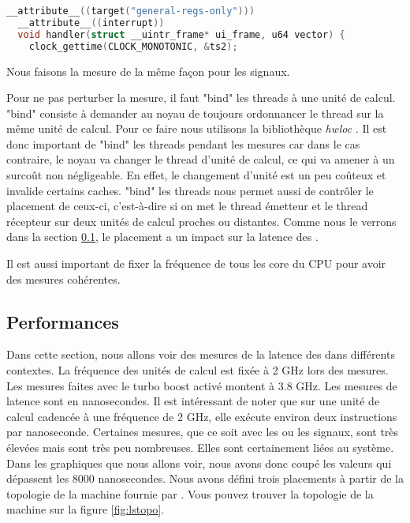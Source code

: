 
\begin{lstlisting}[language=c, caption=Déclaration du handler \uintr{}, label={lst:unitrHandler}]
  __attribute__((target("general-regs-only")))
  __attribute__((interrupt))
  void handler(struct __uintr_frame* ui_frame, u64 vector) {
    clock_gettime(CLOCK_MONOTONIC, &ts2);
\end{lstlisting}


Nous faisons la mesure de la même façon pour les signaux.

Pour ne pas perturber la mesure, il faut "bind" les threads à une unité de calcul.
"bind" consiste à demander au noyau de toujours ordonnancer le thread sur la même unité de calcul.
Pour ce faire nous utilisons la bibliothèque \emph{hwloc} \cite{hwloc}.
Il est donc important de "bind" les threads pendant les mesures car dans le cas contraire,
le noyau va changer le thread d'unité de calcul, ce qui va amener à un surcoût non négligeable.
En effet, le changement d'unité est un peu coûteux et invalide certains caches.
"bind" les threads nous permet aussi de contrôler le placement de ceux-ci, c'est-à-dire si on met le thread émetteur et le thread récepteur sur deux unités de calcul proches ou distantes.
Comme nous le verrons dans la section \ref{sec:performance}, le placement a un impact sur la latence des \uintr{}.

Il est aussi important de fixer la fréquence de tous les core du CPU pour avoir des mesures cohérentes.

\subsection{Performances}
\label{sec:performance}

Dans cette section, nous allons voir des mesures de la latence des \uintr{} dans différents contextes.
La fréquence des unités de calcul est fixée à 2 GHz lors des mesures.
Les mesures faites avec le turbo boost activé montent à 3.8 GHz.
Les mesures de latence sont en nanosecondes.
Il est intéressant de noter que sur une unité de calcul cadencée à une fréquence de 2 GHz, elle exécute environ deux instructions par nanoseconde. %
Certaines mesures, que ce soit avec les \uintr{} ou les signaux, sont très élevées mais sont très peu nombreuses.
Elles sont certainement liées au système.
Dans les graphiques que nous allons voir, nous avons donc coupé les valeurs qui dépassent les 8000 nanosecondes. %
Nous avons défini trois placements à partir de la topologie de la machine fournie par \atos{}.
Vous pouvez trouver la topologie de la machine sur la figure \ref{fig:lstopo}.

